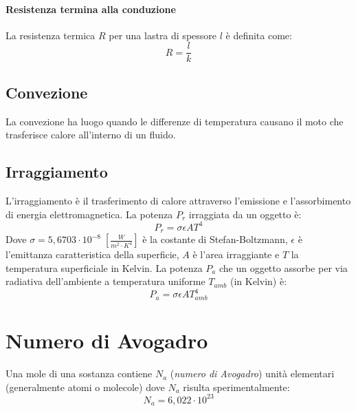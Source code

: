             \paragraph{Resistenza termina alla conduzione} La resistenza 
            termica $R$ per una lastra di spessore $l$ è definita come:
                \begin{equation}
                    R = \frac{l}{k}
                \end{equation}

            \subsection{Convezione} La convezione ha luogo quando le differenze
            di temperatura causano il moto che trasferisce calore all'interno 
            di un fluido.

            \subsection{Irraggiamento} L'irraggiamento è il trasferimento di 
            calore attraverso l'emissione e l'assorbimento di energia 
            elettromagnetica. La potenza $P_r$ irraggiata da un oggetto è:
                \begin{equation}
                    P_r = \sigma \epsilon AT^4
                \end{equation}
            Dove $\sigma = 5,6703 \cdot 10^{-8} \; [\frac{W}{m^2 \cdot K^4}
            ]$ è la costante di Stefan-Boltzmann, $\epsilon$ è l'emittanza
            caratteristica della superficie, $A$ è l'area irraggiante e $T$ la 
            temperatura superficiale in Kelvin. La potenza $P_a$ che un oggetto
            assorbe per via radiativa dell'ambiente a temperatura uniforme
            $T_{amb}$ (in Kelvin) è:
                \begin{equation}
                    P_a = \sigma \epsilon AT^4_{amb}
                \end{equation}

    \section{Numero di Avogadro} Una mole di una sostanza contiene $N_a$
    (\textit{numero di Avogadro}) unità elementari (generalmente atomi o 
    molecole) dove $N_a$ risulta sperimentalmente:
        \begin{equation*}
            N_a = 6,022 \cdot 10^{23}
        \end{equation*}

